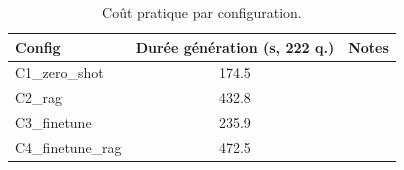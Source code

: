 \begin{table}[t]
\centering
\caption{Coût pratique par configuration.}
\label{tab:cost-comparison}
\begin{tabular}{lcc}
\toprule
Config & Durée génération (s, 222 q.) & Notes \\
\midrule
C1_zero_shot & 174.5 & \\
C2_rag & 432.8 & \\
C3_finetune & 235.9 & \\
C4_finetune_rag & 472.5 & \\
\bottomrule
\end{tabular}
\end{table}
